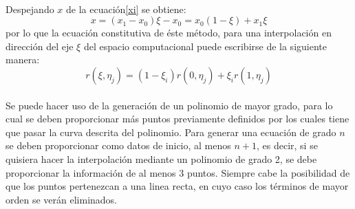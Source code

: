 \documentclass[letterpaper, openright, 12pt]{book}
\begin{document}
    \paragraph*{}
        Despejando $x$ de la ecuación\ref{xi} se obtiene:
        \begin{equation}
            x = (x_{1} - x_{0})\xi - x_{0} = x_{0}(1 - \xi) + x_{1}\xi
        \end{equation}
        por lo que la ecuación constitutiva de éste método, para una
        interpolación en dirección del eje $\xi$ del espacio computacional puede
        escribirse de la siguiente manera:
        \begin{equation}
            r(\xi, \eta_{j}) = (1 - \xi_{i}) r(0, \eta_{j}) + \xi_{i}r(1, \eta_{j})
        \end{equation}

    \paragraph*{}
        Se puede hacer uso de la generación de un polinomio de mayor grado, para
        lo cual se deben proporcionar más puntos previamente definidos por los
        cuales tiene que pasar la curva descrita del polinomio. Para generar una
        ecuación de grado $n$ se deben proporcionar como datos de inicio, al
        menos $n+1$, es decir, si se quisiera hacer la interpolación mediante un
        polinomio de grado 2, se debe proporcionar la información de al menos 3
        puntos. Siempre cabe la posibilidad de que los puntos pertenezcan a una
        linea recta, en cuyo caso los términos de mayor orden se verán
        eliminados.
\end{document}
